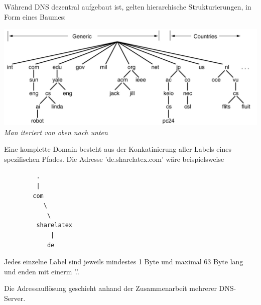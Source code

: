 \documentclass{article}
\begin{document}
    Während DNS dezentral aufgebaut ist, gelten hierarchische Strukturierungen, in Form eines Baumes:
    \begin{center}
        \includegraphics[width=\textwidth]{DNSNameSpace.png}\\
        \textit{Man iteriert von oben nach unten}
    \end{center}
    Eine komplette Domain besteht aus der Konkatinierung aller Labels eines spezifischen Pfades. Die Adresse 'de.sharelatex.com' wäre beispielsweise
    \begin{verbatim}
         .
         |
        com
           \
            \
         sharelatex
             |
            de
    \end{verbatim}
    Jedes einzelne Label sind jeweils mindestes 1 Byte und maximal 63 Byte lang und enden mit einerm '.'.
    
    Die Adressauflösung geschieht anhand der Zusammenarbeit mehrerer DNS-Server.
    
\end{document}
